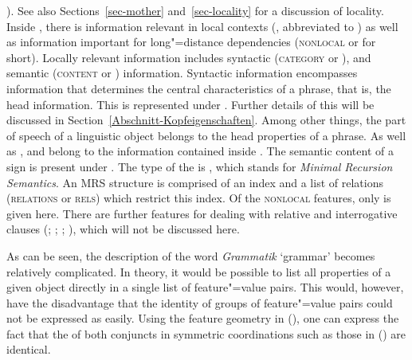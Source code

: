 \citeyear[]{ps2}). See also Sections~\ref{sec-mother} and~\ref{sec-locality} for a
discussion of locality. Inside \synsem, there is information relevant in local contexts (\local,
abbreviated to \HPSGloc) as well as information important for long"=distance dependencies
(\textsc{nonlocal} or \nonloc for short). Locally relevant information includes syntactic
(\textsc{category} or \cat), and semantic (\textsc{content} or \cont) information. Syntactic
information encompasses information that determines the central characteristics of a phrase, that
is, the head information. This is represented under \head. Further details of this will be discussed in
 Section~\ref{Abschnitt-Kopfeigenschaften}. Among other things, the part of speech of a 
 linguistic object belongs to the head properties of a phrase. As well as \head, \spr and \comps belong to the information contained inside \cat. The semantic content
 of a sign is present under \cont. The type of the \contv is , which stands for \emph{Minimal Recursion
Semantics}\indexmrs \citep*{CFPS2005a}. An MRS structure is comprised of an index and a list of
relations (\textsc{relations} or \textsc{rels}) which restrict this index. Of the \textsc{nonlocal} features, only \slasch is given here. There are further features for dealing with relative
and interrogative clauses (\citealp{ps2}; \citealp{Sag97a};
\citealp{GSag2000a-u}; \citealp{Holler2005a-u}), which will not be discussed here.

As can be seen, the description of the word \emph{Grammatik} `grammar' becomes relatively complicated. In theory, it would be possible to list all properties
of a given object directly in a single list of feature"=value pairs. This would, however, have the disadvantage that the identity of groups of feature"=value pairs could not be
expressed as easily. Using the feature geometry in (), one can express the fact that the \catvs of both conjuncts in symmetric coordinations
such as those in () are identical.\label{Seite-HPSG-Koordination}

